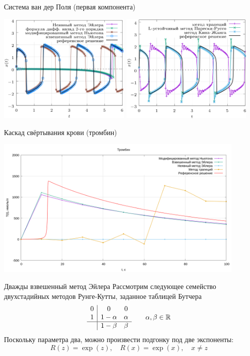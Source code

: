 \documentclass[
    14pt,
    xcolor=dvipsnames,
    aspectratio=169
]{beamer}
\begin{document}
\begin{frame}{Система ван дер Поля (первая компонента)}
    \begin{center}
        \includegraphics[width=0.48\textwidth]{./images/slides/van_der_Pol_1.png}
        \hfill
        \includegraphics[width=0.48\textwidth]{./images/slides/van_der_Pol_2.png}
    \end{center}
\end{frame}

\begin{frame}[c]{Каскад свёртывания крови (тромбин)}
    \begin{center}
        \includegraphics[width=0.91\textwidth]{./images/slides/thrombin.png}
    \end{center}
\end{frame}

\begin{frame}{Дважды взвешенный метод Эйлера}
    Рассмотрим следующее семейство двухстадийных методов Рунге-Кутты,
    заданное таблицей Бутчера
    \[
        \begin{array}{c|cc}
            0 & 0 & 0 \\
            1 & 1 - \alpha & \alpha \\
            \hline
             & 1 - \beta & \beta
        \end{array}
        \qquad
        \alpha, \beta \in \mathbb{R}
    \]
    Поскольку параметра два, можно произвести подгонку под две экспоненты:
    \[
        R(z) = \exp(z), \quad R(x) = \exp(x), \quad x \neq z
    \]
\end{frame}
\end{document}

